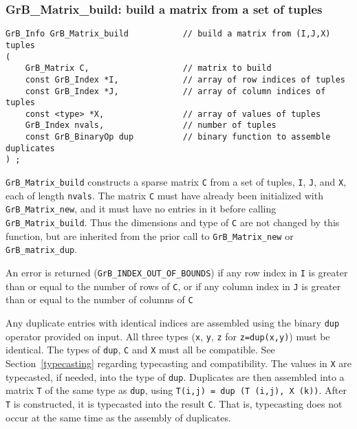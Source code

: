 \documentclass[12pt]{article}
\begin{document}
\subsubsection{{\sf GrB\_Matrix\_build:} build a matrix from a set of tuples}
\label{matrix_build}

\begin{mdframed}[userdefinedwidth=6in]
{\footnotesize
\begin{verbatim}
GrB_Info GrB_Matrix_build           // build a matrix from (I,J,X) tuples
(
    GrB_Matrix C,                   // matrix to build
    const GrB_Index *I,             // array of row indices of tuples
    const GrB_Index *J,             // array of column indices of tuples
    const <type> *X,                // array of values of tuples
    GrB_Index nvals,                // number of tuples
    const GrB_BinaryOp dup          // binary function to assemble duplicates
) ;
\end{verbatim} } \end{mdframed}

\verb'GrB_Matrix_build' constructs a sparse matrix \verb'C' from a set of
tuples, \verb'I', \verb'J', and \verb'X', each of length \verb'nvals'.  The
matrix \verb'C' must have already been initialized with \verb'GrB_Matrix_new',
and it must have no entries in it before calling \verb'GrB_Matrix_build'.  Thus
the dimensions and type of \verb'C' are not changed by this function, but are
inherited from the prior call to \verb'GrB_Matrix_new' or
\verb'GrB_matrix_dup'.

An error is returned (\verb'GrB_INDEX_OUT_OF_BOUNDS') if any row index in
\verb'I' is greater than or equal to the number of rows of \verb'C', or if any
column index in \verb'J' is greater than or equal to the number of columns of
\verb'C'

Any duplicate entries with identical indices are assembled using the binary
\verb'dup' operator provided on input.  All three types (\verb'x', \verb'y',
\verb'z' for \verb'z=dup(x,y)') must be identical.  The types of \verb'dup',
\verb'C' and \verb'X' must all be compatible.  See Section~\ref{typecasting}
regarding typecasting and compatibility.  The values in \verb'X' are
typecasted, if needed, into the type of \verb'dup'.  Duplicates are then
assembled into a matrix \verb'T' of the same type as \verb'dup', using
\verb'T(i,j) = dup (T (i,j), X (k))'.  After \verb'T' is constructed, it is
typecasted into the result \verb'C'.  That is, typecasting does not occur at
the same time as the assembly of duplicates.
\end{document}
